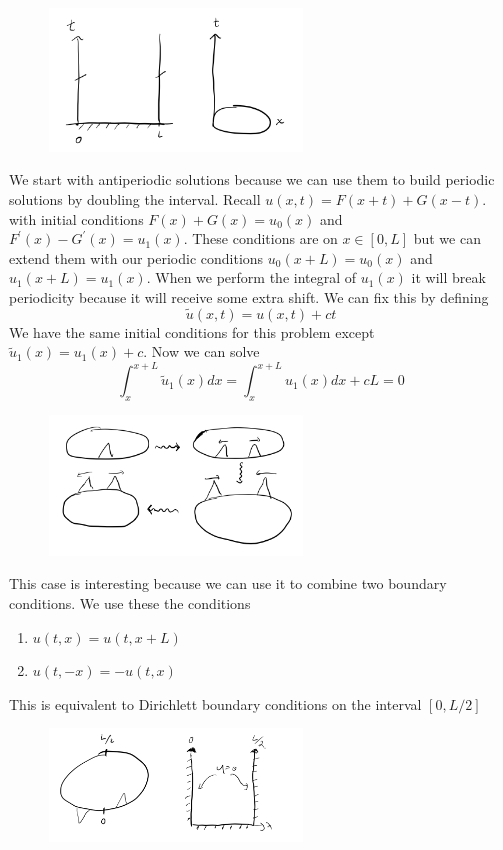 \documentclass[11pt,a4paper]{article}
\begin{document}
\begin{figure}[H]
	\centering
	\includegraphics[width=0.6\textwidth]{pbc.png} %
\end{figure}

We start with antiperiodic solutions because we can use them to build periodic solutions by doubling the interval. Recall $u(x,t) = F(x+t)+G(x-t)$. with initial conditions $F(x)+G(x) = u_{0}(x)$ and $F^{\prime}(x)-G^{\prime}(x)= u_{1}(x)$. These conditions are on $x\in[0,L]$ but we can extend them with our periodic conditions $u_{0}(x+L) = u_{0}(x)$ and $u_{1}(x+L) = u_{1}(x)$. When we perform the integral of $u_{1}(x)$ it will break periodicity because it will receive some extra shift. We can fix this by defining
$$
\tilde{u}(x,t) = u(x,t)+ct
$$
We have the same initial conditions for this problem except $\tilde{u}_{1}(x) = u_{1}(x)+c$. Now we can solve
$$
\int_{x}^{x+L}\tilde{u}_{1}(x)dx = \int_{x}^{x+L}u_{1}(x)dx + cL = 0
$$
\begin{figure}[H]
	\centering
	\includegraphics[width=0.6\textwidth]{onaring.png} %
\end{figure}
This case is interesting because we can use it to combine two boundary conditions. We use these the conditions
\begin{enumerate}
\item $u(t,x)=u(t,x+L)$
\item $u(t,-x) = -u(t,x)$
\end{enumerate}
This is equivalent to Dirichlett boundary conditions on the interval $[0,L/2]$
\begin{figure}[H]
	\centering
	\includegraphics[width=0.6\textwidth]{equaldirichlett.png} %
\end{figure}
\end{document}
